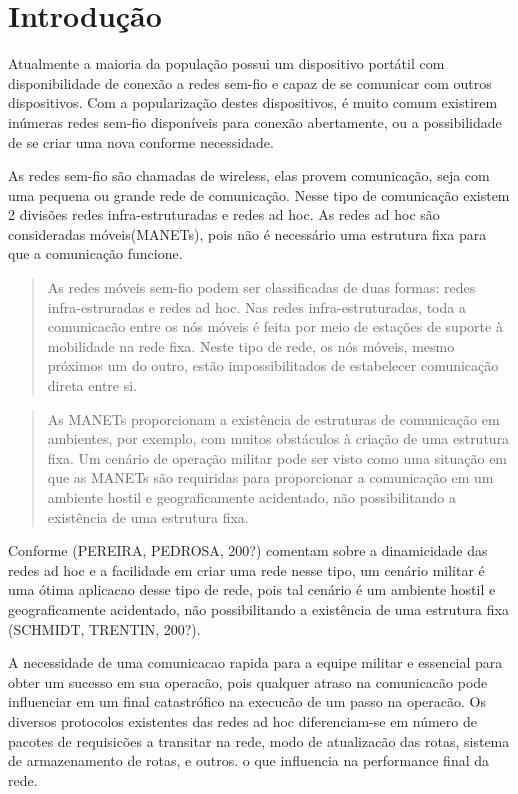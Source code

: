 \section{Introdu\c{c}\~ao} 

Atualmente a maioria da popula\c{c}\~ao possui um dispositivo port\'atil com disponibilidade de conex\~ao a redes sem-fio e capaz de se comunicar com outros dispositivos. Com a populariza\c{c}\~ao destes dispositivos, \'e muito comum existirem in\'umeras redes sem-fio dispon\'iveis para conex\~ao abertamente, ou a possibilidade de se criar uma nova conforme necessidade.

As redes sem-fio s\~ao chamadas de wireless, elas provem comunica\c{c}\~ao, seja com uma pequena ou grande rede de comunica\c{c}\~ao. Nesse tipo de comunica\c{c}\~ao existem 2 divis\~oes redes infra-estruturadas e redes ad hoc. As redes ad hoc s\~ao consideradas m\'oveis(MANETs), pois n\~ao \'e necess\'ario uma estrutura fixa para que a comunica\c{c}\~ao funcione.

\begin{quote}
As redes m\'oveis sem-fio podem ser classificadas de duas formas: redes infra-estruradas e redes ad hoc. Nas redes infra-estruturadas, toda a comunicac\~ao entre os n\'os m\'oveis \'e feita por meio de esta\c{c}\~oes de suporte \`a mobilidade na rede fixa. Neste tipo de rede, os n\'os m\'oveis, mesmo pr\'oximos um do outro, est\~ao impossibilitados de estabelecer comunica\c{c}\~ao direta entre si.
\end{quote}

\begin{quote}
As MANETs proporcionam a exist\^encia de estruturas de comunica\c{c}\~ao em ambientes, por exemplo, com muitos obst\'aculos \`a cria\c{c}\~ao de uma estrutura fixa. Um cen\'ario de opera\c{c}\~ao militar pode ser visto como uma situa\c{c}\~ao em que as MANETs s\~ao requiridas para proporcionar a comunica\c{c}\~ao em um ambiente hostil e geograficamente acidentado, n\~ao possibilitando a exist\^encia de uma estrutura fixa.
\end{quote}

Conforme (PEREIRA, PEDROSA, 200?) comentam sobre a dinamicidade das redes ad hoc e a facilidade em criar uma rede nesse tipo, um cen\'ario militar \'e uma \'otima aplicacao desse tipo de rede, pois tal cen\'ario \'e um ambiente hostil e geograficamente acidentado, n\~ao possibilitando a exist\^encia de uma estrutura fixa (SCHMIDT, TRENTIN, 200?).

A necessidade de uma comunicacao rapida para a equipe militar e essencial para obter um sucesso em sua operac\~ao, pois qualquer atraso na comunicac\~ao pode influenciar em um final catastr\'ofico na execuc\~ao de um passo na operac\~ao. Os diversos protocolos existentes das redes ad hoc diferenciam-se em n\'umero de pacotes de requisic\~oes a transitar na rede, modo de atualizac\~ao das rotas, sistema de armazenamento de rotas, e outros. o que influencia na performance final da rede.
